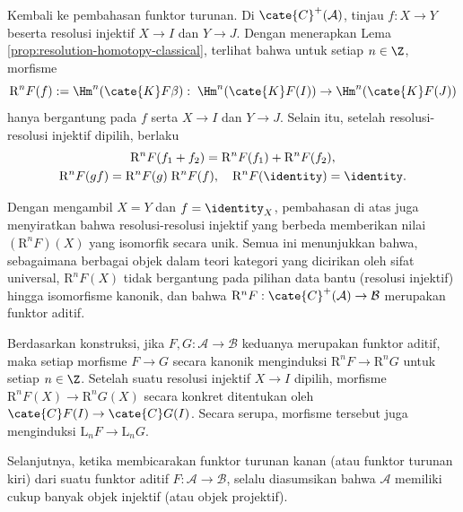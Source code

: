 Kembali ke pembahasan funktor turunan. Di $\cate{C}^+(\mathcal{A})$, tinjau $f: X \to Y$ beserta resolusi injektif $X \to I$ dan $Y \to J$. Dengan menerapkan Lema \ref{prop:resolution-homotopy-classical}, terlihat bahwa untuk setiap $n \in \Z$, morfisme
\[ \mathrm{R}^n F(f) := \Hm^n(\cate{K}F\beta): \; \Hm^n(\cate{K}F(I)) \to \Hm^n(\cate{K}F(J)) \]
hanya bergantung pada $f$ serta $X \to I$ dan $Y \to J$. Selain itu, setelah resolusi-resolusi injektif dipilih, berlaku
\begin{gather*}
	\mathrm{R}^n F(f_1 + f_2) = \mathrm{R}^n F(f_1) + \mathrm{R}^n F(f_2), \\
	\mathrm{R}^n F(gf) = \mathrm{R}^n F(g) \; \mathrm{R}^n F(f), \quad \mathrm{R}^n F(\identity) = \identity.
\end{gather*}

Dengan mengambil $X = Y$ dan $f = \identity_X$, pembahasan di atas juga menyiratkan bahwa resolusi-resolusi injektif yang berbeda memberikan nilai $(\mathrm{R}^n F)(X)$ yang isomorfik secara unik. Semua ini menunjukkan bahwa, sebagaimana berbagai objek dalam teori kategori yang dicirikan oleh sifat universal, $\mathrm{R}^n F(X)$ tidak bergantung pada pilihan data bantu (resolusi injektif) hingga isomorfisme kanonik, dan bahwa $\mathrm{R}^n F: \cate{C}^{+}(\mathcal{A}) \to \mathcal{B}$ merupakan funktor aditif.

Berdasarkan konstruksi, jika $F, G: \mathcal{A} \to \mathcal{B}$ keduanya merupakan funktor aditif, maka setiap morfisme $F \to G$ secara kanonik menginduksi $\mathrm{R}^n F \to \mathrm{R}^n G$ untuk setiap $n \in \Z$. Setelah suatu resolusi injektif $X \to I$ dipilih, morfisme $\mathrm{R}^n F (X) \to \mathrm{R}^n G (X)$ secara konkret ditentukan oleh $\cate{C}F(I) \to \cate{C}G(I)$. Secara serupa, morfisme tersebut juga menginduksi $\mathrm{L}_n F \to \mathrm{L}_n G$.

\begin{konvensi}
	Selanjutnya, ketika membicarakan funktor turunan kanan (atau funktor turunan kiri) dari suatu funktor aditif $F: \mathcal{A} \to \mathcal{B}$, selalu diasumsikan bahwa $\mathcal{A}$ memiliki cukup banyak objek injektif (atau objek projektif).
\end{konvensi}


